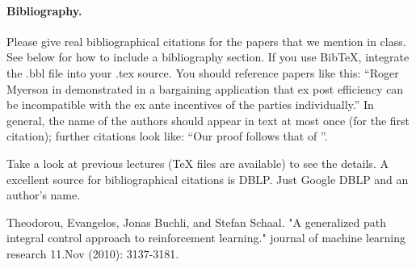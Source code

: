 \documentclass[11pt]{article}
\begin{document}
\paragraph{Bibliography.}
Please give real bibliographical citations for the papers that we
mention in class. See below for how to include a bibliography section.
If you use BibTeX, integrate the .bbl file into your .tex
source. You should reference papers like this: ``Roger Myerson in \cite{1} demonstrated
in a bargaining application that ex post
efficiency can be incompatible with the
ex ante incentives of the parties individually.''
In general, the name of the authors should appear in text at most once 
(for the first citation); further citations look like: ``Our proof follows 
that of \cite{1}''.

Take a look at previous lectures (TeX files are available) to see the
details. A excellent source for bibliographical citations is
DBLP. Just Google DBLP and an author's name.




\begin{thebibliography}{42}

Theodorou, Evangelos, Jonas Buchli, and Stefan Schaal. "A generalized path integral control approach to reinforcement learning." journal of machine learning research 11.Nov (2010): 3137-3181.	


\end{thebibliography}
\end{document}
